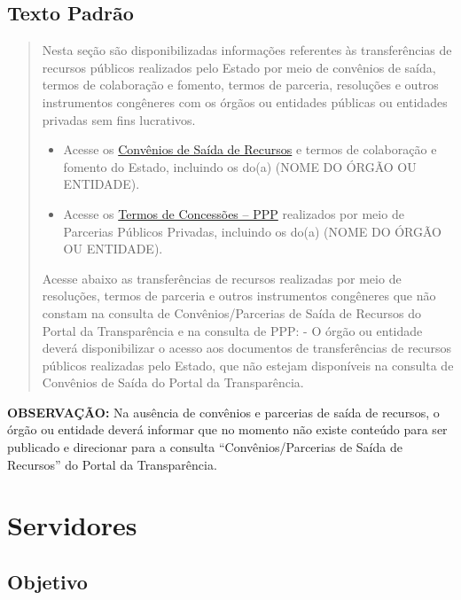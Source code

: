 \documentclass[
]{book}
\begin{document}
\hypertarget{texto-padruxe3o-7}{%
\subsection{Texto Padrão}\label{texto-padruxe3o-7}}

\begin{quote}
Nesta seção são disponibilizadas informações referentes às transferências de recursos públicos realizados pelo Estado por meio de convênios de saída, termos de colaboração e fomento, termos de parceria, resoluções e outros instrumentos congêneres com os órgãos ou entidades públicas ou entidades privadas sem fins lucrativos.

\begin{itemize}
\item
  Acesse os \href{http://www.transparencia.mg.gov.br/convenios/convenios-de-saida}{Convênios de Saída de Recursos} e termos de colaboração e fomento do Estado, incluindo os do(a) (NOME DO ÓRGÃO OU ENTIDADE).
\item
  Acesse os \href{http://www.ppp.mg.gov.br/}{Termos de Concessões -- PPP} realizados por meio de Parcerias Públicos Privadas, incluindo os do(a) (NOME DO ÓRGÃO OU ENTIDADE).
\end{itemize}

Acesse abaixo as transferências de recursos realizadas por meio de resoluções, termos de parceria e outros instrumentos congêneres que não constam na consulta de Convênios/Parcerias de Saída de Recursos do Portal da Transparência e na consulta de PPP:
- O órgão ou entidade deverá disponibilizar o acesso aos documentos de transferências de recursos públicos realizadas pelo Estado, que não estejam disponíveis na consulta de Convênios de Saída do Portal da Transparência.
\end{quote}

\textbf{OBSERVAÇÃO:} Na ausência de convênios e parcerias de saída de recursos, o órgão ou entidade deverá informar que no momento não existe conteúdo para ser publicado e direcionar para a consulta ``Convênios/Parcerias de Saída de Recursos'' do Portal da Transparência.

\hypertarget{servidores}{%
\section{Servidores}\label{servidores}}

\hypertarget{objetivo-7}{%
\subsection{Objetivo}\label{objetivo-7}}
\end{document}
